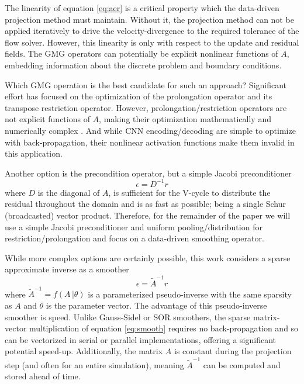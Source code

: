 \documentclass[]{elsarticle}
\begin{document}
The linearity of equation \ref{eq:aer} is a critical property which the data-driven projection method must maintain. Without it, the projection method can not be applied iteratively to drive the velocity-divergence to the required tolerance of the flow solver. However, this linearity is only with respect to the update and residual fields. The GMG operators can potentially be explicit nonlinear functions of $A$, embedding information about the discrete problem and boundary conditions. 

Which GMG operation is the best candidate for such an approach? Significant effort has focused on the optimization of the prolongation operator and its transpose restriction operator. However, prolongation/restriction operators are not explicit functions of $A$, making their optimization mathematically and numerically complex \cite{KATRUTSA2020112524,greenfeld2019learning}. And while CNN encoding/decoding are simple to optimize with back-propagation, their nonlinear activation functions make them invalid in this application. 

Another option is the precondition operator, but a simple Jacobi preconditioner
\begin{equation}
    \epsilon = D^{-1}r
\end{equation}
where $D$ is the diagonal of $A$, is sufficient for the V-cycle to distribute the residual throughout the domain and is as fast as possible; being a single Schur (broadcasted) vector product. Therefore, for the remainder of the paper we will use a simple Jacobi preconditioner and uniform pooling/distribution for restriction/prolongation and focus on a data-driven smoothing operator.

While more complex options are certainly possible, this work considers a sparse approximate inverse as a smoother
\begin{equation}\label{eq:smooth}
    \epsilon = \tilde A^{-1}r
\end{equation}
where $\tilde A^{-1}=f(A\,|\theta)$ is a parameterized pseudo-inverse with the same sparsity as $A$ and $\theta$ is the parameter vector. The advantage of this pseudo-inverse smoother is speed. Unlike Gauss-Sidel or SOR smoothers, the sparse matrix-vector multiplication of equation \ref{eq:smooth} requires no back-propagation and so can be vectorized in serial or parallel implementations, offering a significant potential speed-up. Additionally, the matrix $A$ is constant during the projection step (and often for an entire simulation), meaning $\tilde A^{-1}$ can be computed and stored ahead of time.
\end{document}
